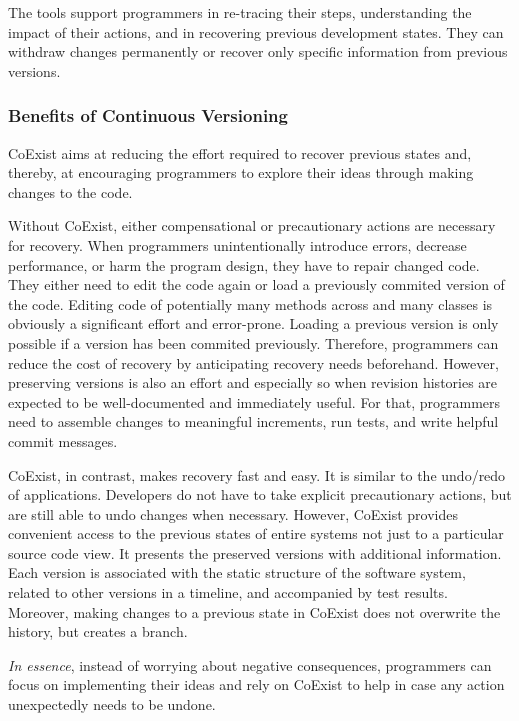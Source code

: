 The tools support programmers in re-tracing their steps, understanding the impact of their actions, and in recovering previous development states.
They can withdraw changes permanently or recover only specific information from previous versions.


\subsubsection{Benefits of Continuous Versioning}

CoExist aims at reducing the effort required to recover previous states and, thereby, at encouraging programmers to explore their ideas through making changes to the code.

Without CoExist, either compensational or precautionary actions are necessary for recovery.
When programmers unintentionally introduce errors, decrease performance, or harm the program design, they have to repair changed code.
They either need to edit the code again or load a previously commited version of the code.
Editing code of potentially many methods across and many classes is obviously a significant effort and error-prone.
Loading a previous version is only possible if a version has been commited previously.
Therefore, programmers can reduce the cost of recovery by anticipating recovery needs beforehand.
However, preserving versions is also an effort and especially so when revision histories are expected to be well-documented and immediately useful.
For that, programmers need to assemble changes to meaningful increments, run tests, and write helpful commit messages.

CoExist, in contrast, makes recovery fast and easy.
It is similar to the undo/redo of applications.
Developers do not have to take explicit precautionary actions, but are still able to undo changes when necessary.
However, CoExist provides convenient access to the previous states of entire systems not just to a particular source code view.
It presents the preserved versions with additional information.
Each version is associated with the static structure of the software system, related to other versions in a timeline, and accompanied by test results.
Moreover, making changes to a previous state in CoExist does not overwrite the history, but creates a branch.

\emph{In essence}, instead of worrying about negative consequences, programmers can focus on implementing their ideas and rely on CoExist to help in case any action unexpectedly needs to be undone.
